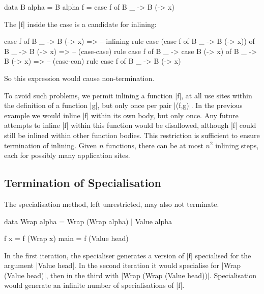 \documentclass[preprint]{sigplanconf}
\begin{document}
\begin{example}
\begin{code}
data B alpha = B alpha
f = case  f of
          B _ -> B (\x -> x)
\end{code}

\noindent The |f| inside the case is a candidate for inlining:

\ignore\begin{code}
case f of B _ -> B (\x -> x)
    => -- inlining rule
case (case f of B _ -> B (\x -> x)) of B _ -> B (\x -> x)
    => -- (case-case) rule
case f of B _ -> case B (\x -> x) of B _ -> B (\x -> x)
    => -- (case-con) rule
case f of B _ -> B (\x -> x)
\end{code}

\noindent So this expression would cause non-termination.
\end{example}

To avoid such problems, we permit inlining a function |f|, at all use sites within the definition of a function |g|, but only once per pair |(f,g)|. In the previous example we would inline |f| within its own body, but only once. Any future attempts to inline |f| within this function would be disallowed, although |f| could still be inlined within other function bodies. This restriction is sufficient to ensure termination of inlining. Given $n$ functions, there can be at most $n^2$ inlining steps, each for possibly many application sites.


\subsection{Termination of Specialisation}
\label{sec:termination_specialisation}

The specialisation method, left unrestricted, may also not terminate.

\begin{example}
\label{ex:wrap}
\begin{code}
data Wrap alpha = Wrap (Wrap alpha) | Value alpha

f x = f (Wrap x)
main = f (Value head)
\end{code}

In the first iteration, the specialiser generates a version of |f| specialised for the argument |Value head|. In the second iteration it would specialise for |Wrap (Value head)|, then in the third with |Wrap (Wrap (Value head))|. Specialisation would generate an infinite number of specialisations of |f|.
\end{example}
\end{document}
